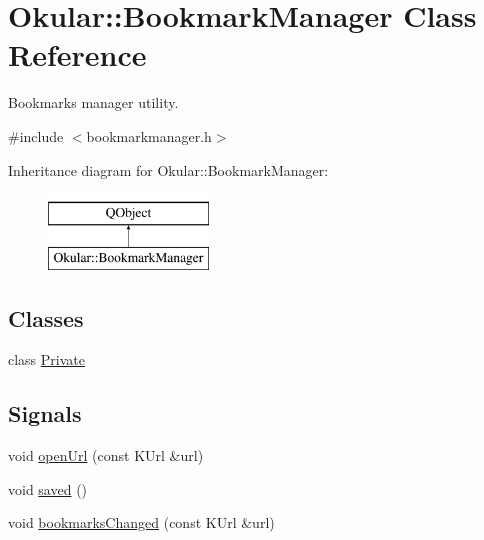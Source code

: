 \hypertarget{classOkular_1_1BookmarkManager}{\section{Okular\+:\+:Bookmark\+Manager Class Reference}
\label{classOkular_1_1BookmarkManager}
}


Bookmarks manager utility.  




{\ttfamily \#include $<$bookmarkmanager.\+h$>$}

Inheritance diagram for Okular\+:\+:Bookmark\+Manager\+:\begin{figure}[H]
\begin{center}
\leavevmode
\includegraphics[height=2.000000cm]{classOkular_1_1BookmarkManager}
\end{center}
\end{figure}
\subsection*{Classes}
\begin{DoxyCompactItemize}
\item 
class \hyperlink{classBookmarkManager_1_1Private}{Private}
\end{DoxyCompactItemize}
\subsection*{Signals}
\begin{DoxyCompactItemize}
\item 
void \hyperlink{classOkular_1_1BookmarkManager_a4141e9880af774f72d8e0616ca4a6392}{open\+Url} (const K\+Url \&url)
\item 
void \hyperlink{classOkular_1_1BookmarkManager_a60926c4115be32b182913e56fd709e18}{saved} ()
\item 
void \hyperlink{classOkular_1_1BookmarkManager_af46858377e563eb8277226eb853a0608}{bookmarks\+Changed} (const K\+Url \&url)
\end{DoxyCompactItemize}
